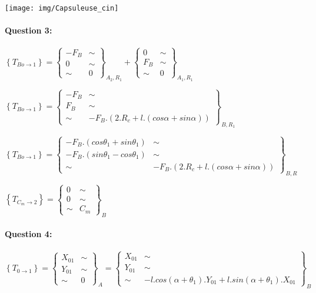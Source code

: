 \begin{center}
 \texttt{[image: img/Capsuleuse\_cin]}
\end{center}

\paragraph{Question 3:}

$\left\{T_{Bo\rightarrow 1}\right\}=\left\{\begin{array}{cc}
-F_B & \sim \\
0 & \sim \\
\sim & 0
\end{array}\right\}_{A_2,R_1}+
\left\{\begin{array}{cc}
0 & \sim \\
F_B & \sim \\
\sim & 0
\end{array}\right\}_{A_1,R_1}$

$\left\{T_{Bo\rightarrow 1}\right\}=
\left\{\begin{array}{cc}
-F_B & \sim \\
F_B & \sim \\
\sim & -F_B.(2.R_c+l.(cos\alpha+sin\alpha))
\end{array}\right\}_{B,R_1}$

$\left\{T_{Bo\rightarrow 1}\right\}=
\left\{\begin{array}{cc}
-F_B.(cos\theta_1+sin\theta_1) & \sim \\
-F_B.(sin\theta_1-cos\theta_1) & \sim \\
\sim & -F_B.(2.R_c+l.(cos\alpha+sin\alpha))
\end{array}\right\}_{B,R}$

$\left\{T_{C_m\rightarrow 2}\right\}=
\left\{\begin{array}{cc}
0 & \sim \\
0 & \sim \\
\sim & C_m
\end{array}\right\}_B$

\paragraph{Question 4:}

$\left\{T_{0\rightarrow 1}\right\}=\left\{\begin{array}{cc}
X_{01} & \sim \\
Y_{01} & \sim \\
\sim & 0
\end{array}\right\}_A=
\left\{\begin{array}{cc}
X_{01} & \sim \\
Y_{01} & \sim \\
\sim & -l.cos(\alpha+\theta_1).Y_{01}+l.sin(\alpha+\theta_1).X_{01}
\end{array}\right\}_B$


